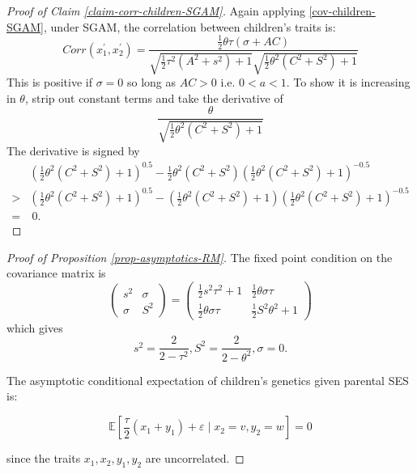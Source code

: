 \documentclass[
  12pt,
]{article}
\theoremstyle{definition}
\theoremstyle{definition}
\theoremstyle{definition}
\theoremstyle{definition}
\theoremstyle{remark}
\begin{document}
\begin{proof}[Proof of Claim \ref{claim-corr-children-SGAM}]

Again applying \eqref{cov-children-SGAM}, under SGAM, the correlation between 
children's traits is:
\[
Corr\left( x_{1}^{\prime },x_{2}^{\prime }\right) =\frac{\frac{1}{2}\theta
\tau \left( \sigma +AC\right) }{\sqrt{\frac{1}{2}\tau ^{2}\left(
A^{2}+s^{2}\right) +1}\sqrt{\frac{1}{2}\theta ^{2}\left( C^{2}+S^{2}\right)
+1}} 
\]
This is positive if $\sigma = 0$ so long as $AC > 0$ i.e. $0 < a < 1$. To show
it is increasing in $\theta$, strip out constant terms and take the derivative of
\[
\frac{\theta}{\sqrt{\frac{1}{2}\theta^2(C^2+S^2) + 1}}
\]
The derivative is signed by
\begin{align*}
& \left(\frac{1}{2}\theta^2(C^2+S^2) + 1\right)^{0.5} -
\frac{1}{2}\theta^2(C^2+S^2)\left(\frac{1}{2}\theta^2(C^2+S^2) + 1\right)^{-0.5} \\
>& \left(\frac{1}{2}\theta^2(C^2+S^2) + 1\right)^{0.5} - 
\left(\frac{1}{2}\theta^2(C^2+S^2)  + 1\right)\left(\frac{1}{2}\theta^2(C^2+S^2) + 1\right)^{-0.5} \\
=&\ 0.
\end{align*}
\end{proof}

\begin{proof}[Proof of Proposition \ref{prop-asymptotics-RM}]

The fixed point condition on the covariance matrix is
\[
\left( 
\begin{array}{cc}
s^{2} & \sigma  \\ 
\sigma  & S^{2}%
\end{array}%
\right) =\left( 
\begin{array}{cc}
\frac{1}{2}s^{2}\tau ^{2}+1 & \frac{1}{2}\theta \sigma \tau  \\ 
\frac{1}{2}\theta \sigma \tau  & \frac{1}{2}S^{2}\theta ^{2}+1%
\end{array}%
\right) 
\]
which gives
\[
s^{2}=\frac{2}{2-\tau ^{2}},S^{2}=\frac{2}{2-\theta ^{2}},\sigma =0.
\]

The asymptotic conditional expectation of children's genetics given parental SES is:

\[
\mathbb{E}\left[ \frac{\tau }{2}\left( x_{1}+y_{1}\right) +\varepsilon \mid
x_{2}=v,y_{2}=w\right] =0
\]%

since the traits $x_1,x_2,y_1,y_2$ are uncorrelated.

\end{proof}
\end{document}
